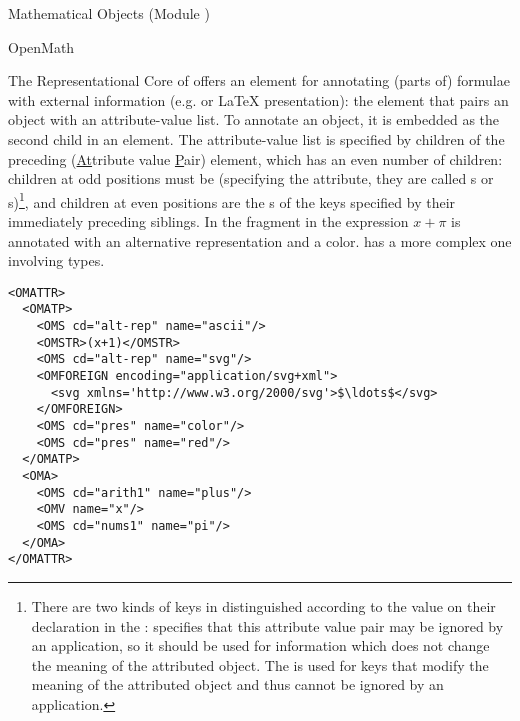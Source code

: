 \begin{tchapter}[id=mobj,short=Mathematical Objects]{Mathematical Objects (Module {})}
\begin{tsection}[id=openmath]{OpenMath}
\begin{tsubsection}[id=om:core]{The Representational Core of {\openmath}}
{\openmath} offers an element for annotating (parts of) formulae with external information
(e.g. {\mathml} or {\LaTeX} presentation): the {} element that
pairs an {\openmath} object with an attribute-value list. To annotate an {\openmath}
object, it is embedded as the second child in an {}
element. The attribute-value list is specified by children of the preceding
{} ({\underline{At}}tribute value {\underline{P}}air) element,
which has an even number of children: children at odd positions must be
{} (specifying the attribute, they are called {s} or
{s})\footnote{There are two kinds of keys in {\openmath} distinguished
  according to the {} value on their {}
  declaration in the {}:
  {} specifies that this attribute value pair may be
  ignored by an application, so it should be used for information which does not change
  the meaning of the attributed {\openmath} object. The {} is used
  for keys that modify the meaning of the attributed {\openmath} object and thus cannot be
  ignored by an application.}, and children at even positions are the {s} of
the keys specified by their immediately preceding siblings. In the {\openmath} fragment in
{} the expression $x+\pi$ is annotated with an alternative representation
and a color.  {} has a more complex one involving types.

\begin{lstlisting}[language=OpenMath,label=lst:omattr,mathescape,
                   caption={Associating Alternate Representations with an
                   {\openmath} Object},
                   numbers=none,index={OMATTR,OMATP}]
<OMATTR>
  <OMATP>
    <OMS cd="alt-rep" name="ascii"/>
    <OMSTR>(x+1)</OMSTR>
    <OMS cd="alt-rep" name="svg"/>
    <OMFOREIGN encoding="application/svg+xml">
      <svg xmlns='http://www.w3.org/2000/svg'>$\ldots$</svg>
    </OMFOREIGN>
    <OMS cd="pres" name="color"/>
    <OMS cd="pres" name="red"/>
  </OMATP>
  <OMA>
    <OMS cd="arith1" name="plus"/>
    <OMV name="x"/>
    <OMS cd="nums1" name="pi"/>
  </OMA>
</OMATTR>
\end{lstlisting}


\end{tsubsection}
\end{tsection}
\end{tchapter}
